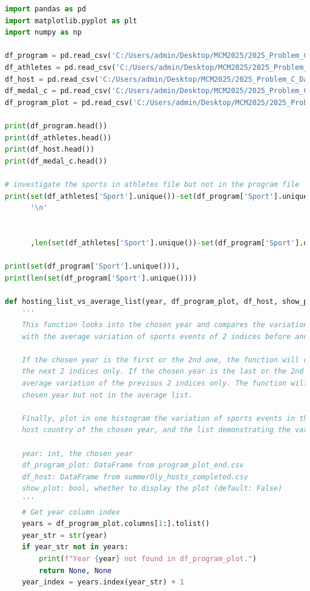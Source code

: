 \documentclass[12pt]{article}
\begin{document}
\begin{lstlisting}[language=Python, style=mystyle, caption=data\_analyze.ipynb]
import pandas as pd
import matplotlib.pyplot as plt
import numpy as np

df_program = pd.read_csv('C:/Users/admin/Desktop/MCM2025/2025_Problem_C_Data/summerOly_programs_v3.0.csv')
df_athletes = pd.read_csv('C:/Users/admin/Desktop/MCM2025/2025_Problem_C_Data/summerOly_athletes_v3.0.csv')
df_host = pd.read_csv('C:/Users/admin/Desktop/MCM2025/2025_Problem_C_Data/summerOly_hosts_completed.csv')
df_medal_c = pd.read_csv('C:/Users/admin/Desktop/MCM2025/2025_Problem_C_Data/summerOly_medal_counts_completed.csv')
df_program_plot = pd.read_csv('C:/Users/admin/Desktop/MCM2025/2025_Problem_C_Data/program_plot_end.csv')

print(df_program.head())
print(df_athletes.head())
print(df_host.head())
print(df_medal_c.head())

# investigate the sports in athletes file but not in the program file
print(set(df_athletes['Sport'].unique())-set(df_program['Sport'].unique()),
      '\n'


      ,len(set(df_athletes['Sport'].unique())-set(df_program['Sport'].unique())))

print(set(df_program['Sport'].unique())),
print(len(set(df_program['Sport'].unique())))

def hosting_list_vs_average_list(year, df_program_plot, df_host, show_plot=False):
    '''
    This function looks into the chosen year and compares the variation of sports events of this certain index of Olympic Games
    with the average variation of sports events of 2 indices before and after the certain one.

    If the chosen year is the first or the 2nd one, the function will compare the variation with the average variation of
    the next 2 indices only. If the chosen year is the last or the 2nd last one, the function will compare the variation with the
    average variation of the previous 2 indices only. The function will return the list of sports events that are held in the
    chosen year but not in the average list.

    Finally, plot in one histogram the variation of sports events in the chosen year and the average distribution. Also, return the
    host country of the chosen year, and the list demonstrating the variation of list of event.

    year: int, the chosen year
    df_program_plot: DataFrame from program_plot_end.csv
    df_host: DataFrame from summerOly_hosts_completed.csv
    show_plot: bool, whether to display the plot (default: False)
    '''
    # Get year column index
    years = df_program_plot.columns[1:].tolist()
    year_str = str(year)
    if year_str not in years:
        print(f"Year {year} not found in df_program_plot.")
        return None, None
    year_index = years.index(year_str) + 1


\end{lstlisting}
\end{document}
